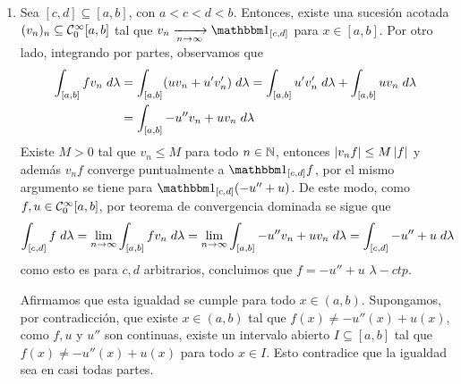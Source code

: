 \documentclass{article}
\begin{document}
\begin{enumerate}
    \item Sea $[c,d]\subseteq[a,b]$, con $a<c<d<b$. Entonces, existe una sucesión acotada 
    $(v_{n})_{n}\subseteq\mathcal{C}_{0}^{\infty}[a,b]$ tal que $v_{n}\xrightarrow[n\to\infty]{}
    \I_{[c,d]}$ para $x\in[a,b]$. Por otro lado, integrando por partes, observamos que
    \begin{align*}
        \int_{[a,b]}fv_{n}\hspace{1mm}d\lambda &= \int_{[a,b]}(uv_{n}+u'v_{n}')\hspace{1mm}d\lambda
        =\int_{[a,b]}u'v_{n}'\hspace{1mm}d\lambda+\int_{[a,b]}uv_{n}\hspace{1mm}d\lambda \\
        &= \int_{[a,b]}-u''v_{n}+uv_{n}\hspace{1mm}d\lambda
    \end{align*}
    Existe $M>0$ tal que $v_{n}\leq M$ para todo $n\in\mathbb{N}$, entonces $\left|v_{n}f \right|\leq M\left|f \right|$ y 
    además $v_{n}f$ converge puntualmente a $\I_{[c,d]}f$, por el mismo argumento se tiene para 
    $\I_{[c,d]}(-u''+u)$. De este modo, como $f,u\in\mathcal{C}_{0}^{\infty}[a,b]$, por teorema de 
    convergencia dominada se sigue que
    \begin{equation*}
        \int_{[c,d]}f\hspace{1mm}d\lambda=\lim\limits_{n\to\infty}
        \int_{[a,b]}fv_{n}\hspace{1mm}d\lambda=\lim\limits_{n\to\infty}
        \int_{[a,b]}-u''v_{n}+uv_{n}\hspace{1mm}d\lambda=\int_{[c,d]}-u''+u\hspace{1mm}d\lambda
    \end{equation*}
    como esto es para $c,d$ arbitrarios, concluimos que $f=-u''+u$ $\lambda-ctp$. 
    
    Afirmamos que esta igualdad se cumple para todo $x\in(a,b)$. Supongamos, por contradicción, 
    que existe $x\in(a,b)$ tal que $f(x)\neq-u''(x)+u(x)$, como $f,u$ y $u''$ son continuas, 
    existe un intervalo abierto $I\subseteq[a,b]$ tal que $f(x)\neq-u''(x)+u(x)$ para todo 
    $x\in I$. Esto contradice que la igualdad sea en casi todas partes.


\end{enumerate}
\end{document}
